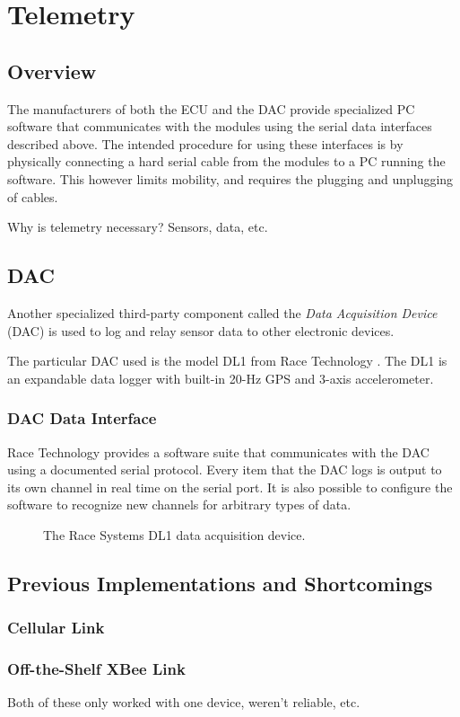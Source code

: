 \section{Telemetry}

\subsection{Overview}

The manufacturers of both the ECU and the DAC provide specialized PC software that communicates with the modules using the serial data interfaces described above. The intended procedure for using these interfaces is by physically connecting a hard serial cable from the modules to a PC running the software. This however limits mobility, and requires the plugging and unplugging of cables.

Why is telemetry necessary? Sensors, data, etc.

\subsection{DAC}

Another specialized third-party component called the \emph{Data Acquisition Device} (DAC) is used to log and relay sensor data to other electronic devices.

The particular DAC used is the model DL1 from Race Technology \cite{DL1Dsheet}. The DL1 is an expandable data logger with built-in 20-Hz GPS and 3-axis accelerometer.

\subsubsection{DAC Data Interface\label{sec:background_dac_data_interface}}

Race Technology provides a software suite that communicates with the DAC using a documented serial protocol. Every item that the DAC logs is output to its own channel in real time on the serial port. It is also possible to configure the software to recognize new channels for arbitrary types of data.

\begin{figure}[H]
\centering
\caption{The Race Systems DL1 data acquisition device.}
\label{fig:dl1_product}
\end{figure}

\subsection{Previous Implementations and Shortcomings}

\subsubsection{Cellular Link}


\subsubsection{Off-the-Shelf XBee Link}

Both of these only worked with one device, weren't reliable, etc.

